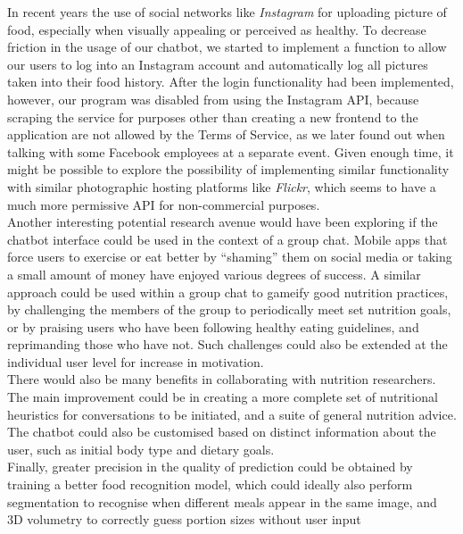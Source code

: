 \documentclass{scrartcl}
\begin{document}
In recent years the use of social networks like \textit{Instagram} for uploading picture of food, especially when visually appealing or perceived as healthy. To decrease friction in the usage of our chatbot, we started to implement a function to allow our users to log into an Instagram account and automatically log all pictures taken into their food history. After the login functionality had been implemented, however, our program was disabled from using the Instagram API, because scraping the service for purposes other than creating a new frontend to the application are not allowed by the Terms of Service, as we later found out when talking with some Facebook employees at a separate event. Given enough time, it might be possible to explore the possibility of implementing similar functionality with similar photographic hosting platforms like \textit{Flickr}, which seems to have a much more permissive API for non-commercial purposes.\\

Another interesting potential research avenue would have been exploring if the chatbot interface could be used in the context of a group chat. Mobile apps that force users to exercise or eat better by ``shaming'' them on social media or taking a small amount of money have enjoyed various degrees of success. A similar approach could be used within a group chat to gameify good nutrition practices, by challenging the members of the group to periodically meet set nutrition goals, or by praising users who have been following healthy eating guidelines, and reprimanding those who have not. Such challenges could also be extended at the individual user level for increase in motivation. \\

There would also be many benefits in collaborating with nutrition researchers. The main improvement could be in creating a more complete set of nutritional heuristics for conversations to be initiated, and a suite of general nutrition advice. The chatbot could also be customised based on distinct information about the user, such as initial body type and dietary goals. \\

Finally, greater precision in the quality of prediction could be obtained by training a better food recognition model, which could ideally also perform segmentation to recognise when different meals appear in the same image, and 3D volumetry to correctly guess portion sizes without user input
\end{document}
